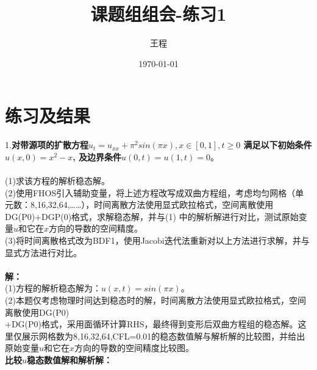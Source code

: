 \documentclass[a4paper,11pt,UTF8]{article}%
\theoremstyle{plain}
\begin{document}
	\title{\heiti 课题组组会-练习1}
	\author{王程 }
	\date{\today}
	\maketitle
	
	\section{练习及结果}
	1.\textbf{对带源项的扩散方程$u_t=u_{xx}+\pi^2sin\left(\pi x\right), x\in\left[0,1\right], t\geq 0$ 满足以下初始条件$u\left(x,0\right)=x^2-x$, 及边界条件$u\left(0,t\right)=u\left(1,t\right)=0$}。\\
	~\\
    \indent(1)求该方程的解析稳态解。\\
    \indent(2)使用FHOS引入辅助变量，将上述方程改写成双曲方程组，考虑均匀网格（单元数：8,16,32,64,……），时间离散方法使用显式欧拉格式，空间离散使用DG(P0)+DGP(0)格式，求解稳态解，并与(1) 中的解析解进行对比，测试原始变量$u$和它在$x$方向的导数的空间精度。\\
	\indent(3)将时间离散格式改为BDF1，使用Jacobi迭代法重新对以上方法进行求解，并与显式方法进行对比。\\
	~\\
	\textbf{解：}\\
	\indent(1)方程的解析稳态解为：$u\left(x,t\right)=sin\left(\pi x\right)$。
	\vspace{10pt}\\
	\indent(2)本题仅考虑物理时间达到稳态时的解，时间离散方法使用显式欧拉格式，空间离散使用DG(P0)\\+DG(P0)格式，采用面循环计算RHS，最终得到变形后双曲方程组的稳态解。这里仅展示网格数为8,16,32,64,CFL=0.01的稳态数值解与解析解的比较图，并给出原始变量$u$和它在$x$方向的导数的空间精度比较图。\\
	\newpage
	\textbf{比较$u$稳态数值解和解析解：}
\end{document}
